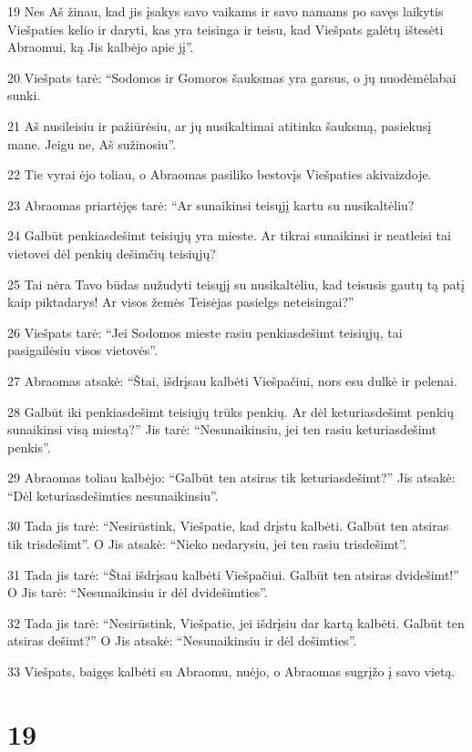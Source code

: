 \par 19 Nes Aš žinau, kad jis įsakys savo vaikams ir savo namams po savęs laikytis Viešpaties kelio ir daryti, kas yra teisinga ir teisu, kad Viešpats galėtų ištesėti Abraomui, ką Jis kalbėjo apie jį”. 
\par 20 Viešpats tarė: “Sodomos ir Gomoros šauksmas yra garsus, o jų nuodėmė­labai sunki. 
\par 21 Aš nusileisiu ir pažiūrėsiu, ar jų nusikaltimai atitinka šauksmą, pasiekusį mane. Jeigu ne, Aš sužinosiu”. 
\par 22 Tie vyrai ėjo toliau, o Abraomas pasiliko bestovįs Viešpaties akivaizdoje. 
\par 23 Abraomas priartėjęs tarė: “Ar sunaikinsi teisųjį kartu su nusikaltėliu? 
\par 24 Galbūt penkiasdešimt teisiųjų yra mieste. Ar tikrai sunaikinsi ir neatleisi tai vietovei dėl penkių dešimčių teisiųjų? 
\par 25 Tai nėra Tavo būdas nužudyti teisųjį su nusikaltėliu, kad teisusis gautų tą patį kaip piktadarys! Ar visos žemės Teisėjas pasielgs neteisingai?” 
\par 26 Viešpats tarė: “Jei Sodomos mieste rasiu penkiasdešimt teisiųjų, tai pasigailėsiu visos vietovės”. 
\par 27 Abraomas atsakė: “Štai, išdrįsau kalbėti Viešpačiui, nors esu dulkė ir pelenai. 
\par 28 Galbūt iki penkiasdešimt teisiųjų trūks penkių. Ar dėl keturiasdešimt penkių sunaikinsi visą miestą?” Jis tarė: “Nesunaikinsiu, jei ten rasiu keturiasdešimt penkis”. 
\par 29 Abraomas toliau kalbėjo: “Galbūt ten atsiras tik keturiasdešimt?” Jis atsakė: “Dėl keturiasdešimties nesunaikinsiu”. 
\par 30 Tada jis tarė: “Nesirūstink, Viešpatie, kad drįstu kalbėti. Galbūt ten atsiras tik trisdešimt”. O Jis atsakė: “Nieko nedarysiu, jei ten rasiu trisdešimt”. 
\par 31 Tada jis tarė: “Štai išdrįsau kalbėti Viešpačiui. Galbūt ten atsiras dvidešimt!” O Jis tarė: “Nesunaikinsiu ir dėl dvidešimties”. 
\par 32 Tada jis tarė: “Nesirūstink, Viešpatie, jei išdrįsiu dar kartą kalbėti. Galbūt ten atsiras dešimt?” O Jis atsakė: “Nesunaikinsiu ir dėl dešimties”. 
\par 33 Viešpats, baigęs kalbėti su Abraomu, nuėjo, o Abraomas sugrįžo į savo vietą.



\chapter{19}


